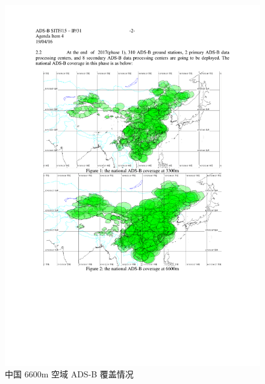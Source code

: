 \begin{figure}[htbp]
\centering
\includegraphics[width=12cm]{pic/china_6600m.pdf}
\caption{中国 6600m 空域 ADS-B 覆盖情况\protect\footnotemark}
\label{fig:china_6600m}
\end{figure}


